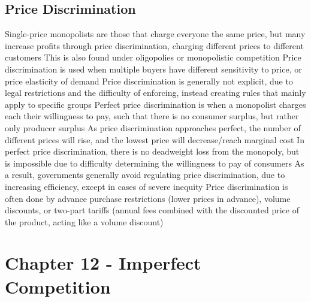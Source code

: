 \documentclass[11 pt, twoside]{article}
\newenvironment{outline*}
{
	\begin{outline}[enumerate]
	}
	{\end{outline}
}
\begin{document}
\subsection{Price Discrimination}
\begin{outline*}
\1 Single-price monopolists are those that charge everyone the same price, but many increase profits through price discrimination, charging different prices to different customers
\2 This is also found under oligopolies or monopolistic competition
\2 Price discrimination is used when multiple buyers have different sensitivity to price, or price elasticity of demand
\2 Price discrimination is generally not explicit, due to legal restrictions and the difficulty of enforcing, instead creating rules that mainly apply to specific groups
\1 Perfect price discrimination is when a monopolist charges each their willingness to pay, such that there is no consumer surplus, but rather only producer surplus
\2 As price discrimination approaches perfect, the number of different prices will rise, and the lowest price will decrease/reach marginal cost
\2 In perfect price discrimination, there is no deadweight loss from the monopoly, but is impossible due to difficulty determining the willingness to pay of consumers
\2 As a result, governments generally avoid regulating price discrimination, due to increasing efficiency, except in cases of severe inequity
\1 Price discrimination is often done by advance purchase restrictions (lower prices in advance), volume discounts, or two-part tariffs (annual fees combined with the discounted price of the product, acting like a volume discount)
\end{outline*}
\section{Chapter 12 - Imperfect Competition}
\end{document}
